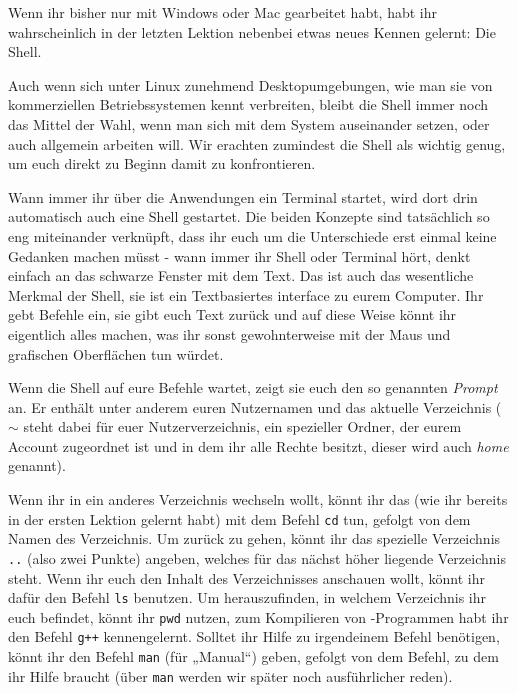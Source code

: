 
Wenn ihr bisher nur mit Windows oder Mac gearbeitet habt, habt ihr
wahrscheinlich in der letzten Lektion nebenbei etwas neues Kennen gelernt: Die
Shell.

Auch wenn sich unter Linux zunehmend Desktopumgebungen, wie man sie von
kommerziellen Betriebssystemen kennt verbreiten, bleibt die Shell immer noch das
Mittel der Wahl, wenn man sich mit dem System auseinander setzen, oder auch
allgemein arbeiten will. Wir erachten zumindest die Shell als wichtig genug, um
euch direkt zu Beginn damit zu konfrontieren.

Wann immer ihr über die Anwendungen ein Terminal startet, wird dort drin
automatisch auch eine Shell gestartet. Die beiden Konzepte sind tatsächlich so
eng miteinander verknüpft, dass ihr euch um die Unterschiede erst einmal keine
Gedanken machen müsst - wann immer ihr Shell oder Terminal hört, denkt einfach
an das schwarze Fenster mit dem Text. Das ist auch das wesentliche Merkmal der
Shell, sie ist ein Textbasiertes interface zu eurem Computer. Ihr gebt Befehle
ein, sie gibt euch Text zurück und auf diese Weise könnt ihr eigentlich alles
machen, was ihr sonst gewohnterweise mit der Maus und grafischen Oberflächen
tun würdet.

Wenn die Shell auf eure Befehle wartet, zeigt sie euch den so genannten
\emph{Prompt} an. Er enthält unter anderem euren Nutzernamen und das aktuelle
Verzeichnis ($\sim$ steht dabei für euer Nutzerverzeichnis, ein spezieller
Ordner, der eurem Account zugeordnet ist und in dem ihr alle Rechte besitzt,
dieser wird auch \emph{home} genannt).

Wenn ihr in ein anderes Verzeichnis wechseln wollt, könnt ihr das (wie ihr
bereits in der ersten Lektion gelernt habt) mit dem Befehl \texttt{cd} tun,
gefolgt von dem Namen des Verzeichnis. Um zurück zu gehen, könnt ihr das
spezielle Verzeichnis \texttt{..} (also zwei Punkte) angeben, welches für das
nächst höher liegende Verzeichnis steht. Wenn ihr euch den Inhalt des
Verzeichnisses anschauen wollt, könnt ihr dafür den Befehl \texttt{ls}
benutzen. Um herauszufinden, in welchem Verzeichnis ihr euch befindet, könnt
ihr \texttt{pwd} nutzen, zum Kompilieren von \Cpp-Programmen habt ihr den Befehl
\texttt{g++} kennengelernt. Solltet ihr Hilfe zu irgendeinem Befehl benötigen,
könnt ihr den Befehl \texttt{man} (für „Manual“) geben, gefolgt von dem Befehl,
zu dem ihr Hilfe braucht (über \texttt{man} werden wir später noch
ausführlicher reden).

\newpage

